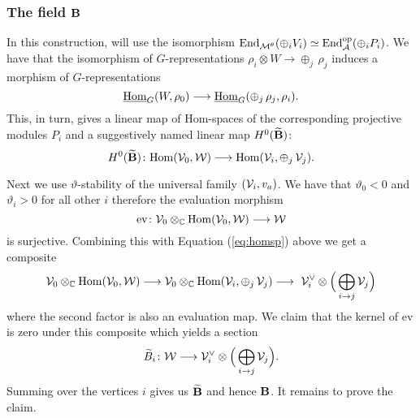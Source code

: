 \documentclass{amsart}
\theoremstyle{definition}
\begin{document}
\subsubsection{The field $\mathbf{B}$}
In this construction, will use the isomorphism $\operatorname{End}_{\mathcal{M}^\theta}(\oplus_i V_i) \simeq \operatorname{End}^{\text{op}}_{\mathcal{A}}(\oplus_i P_i)$.
We have that the isomorphism of $G$-representations $\rho_i \otimes W \rightarrow \oplus_j\, \rho_j$ induces a morphism of $G$-representations $$\underline{\operatorname{Hom}}_G(W,\rho_0) \longrightarrow \underline{\operatorname{Hom}}_G(\oplus_j \, \rho_j, \rho_i).$$
This, in turn, gives a linear map of Hom-spaces of the corresponding projective modules $P_i$ and a suggestively named linear map $H^0(\widetilde{\mathbf{B}})$:
\begin{equation}\label{eq:homsp}
    H^0(\widetilde{\mathbf{B}}) \colon {\operatorname{Hom}}(\mathcal{V}_0, \mathcal{W}) \longrightarrow {\operatorname{Hom}}(\mathcal{V}_i, \oplus_j \, \mathcal{V}_j).
\end{equation}

Next we use $\vartheta$-stability of the universal family $(\mathcal{V}_i, v_a)$.
We have that $\vartheta_0<0$ and $\vartheta_i>0$ for all other $i$ therefore the evaluation morphism $$\text{ev} \colon \mathcal{V}_0 \otimes_{\mathbb{C}} {\operatorname{Hom}}(\mathcal{V}_0, \mathcal{W}) \longrightarrow \mathcal{W}$$ is surjective.
Combining this with Equation (\ref{eq:homsp}) above we get a composite
$$\mathcal{V}_0 \otimes_{\mathbb{C}} {\operatorname{Hom}}(\mathcal{V}_0, \mathcal{W}) \longrightarrow \mathcal{V}_0 \otimes_{\mathbb{C}} {\operatorname{Hom}}(\mathcal{V}_i, \oplus_j \, \mathcal{V}_j) \longrightarrow\ \mathcal{V}_i^\vee \otimes \Big(\bigoplus_{i \rightarrow j}\mathcal{V}_j\Big)$$
where the second factor is also an evaluation map.
We claim that the kernel of ev is zero under this composite which yields a section 
$$\widetilde{B}_i \colon \mathcal{W} \longrightarrow \mathcal{V}_i^\vee \otimes \Big(\bigoplus_{i \rightarrow j}\mathcal{V}_j\Big).$$
Summing over the vertices $i$ gives us $\widetilde{\mathbf{B}}$ and hence $\mathbf{B}$.
It remains to prove the claim.
\end{document}
